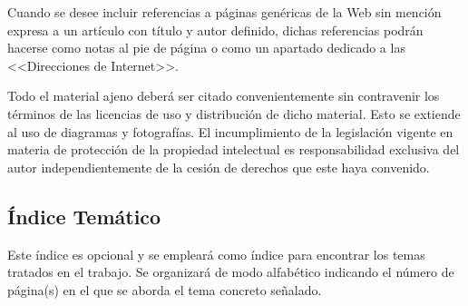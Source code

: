 Cuando se desee incluir referencias a páginas genéricas de la Web sin mención expresa a un artículo con título y autor definido, dichas referencias podrán hacerse como notas al pie de página o como un apartado dedicado a las <<Direcciones de Internet>>.

Todo el material ajeno deberá ser citado convenientemente sin contravenir los términos de las licencias de uso y distribución de dicho material. Esto se extiende al uso de diagramas y fotografías. El incumplimiento de la legislación vigente en materia de protección de la propiedad intelectual es responsabilidad exclusiva del autor independientemente de la cesión de derechos que este haya convenido.


\subsection{Índice Temático}
Este índice es opcional y se empleará como índice para encontrar los temas tratados en el trabajo. Se organizará de modo alfabético indicando el número de página(s) en el que se aborda el tema concreto señalado.
